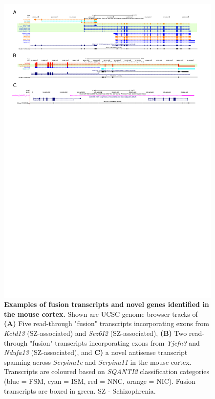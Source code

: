 \begin{landscape}
	\begin{figure}[htp]
		\begin{center}
			\includegraphics[page=1,trim={0 20cm 0 0},scale = 1.2]{Figures/FusionNovelGenes.pdf}
		\end{center}
		\vspace{1cm}
		\captionsetup{width=1.5\textwidth}
		\caption[Examples of fusion transcripts and novel genes identified in the mouse cortex]%
		{\textbf{Examples of fusion transcripts and novel genes identified in the mouse cortex.} Shown are UCSC genome browser tracks of \textbf{(A)} Five read-through "fusion" transcripts incorporating exons from \textit{Kctd13} (SZ-associated) and \textit{Sez6I2} (SZ-associated), \textbf{(B)} Two read-through "fusion" transcripts incorporating exons from \textit{Yjefn3} and \textit{Ndufa13} (SZ-associated), and \textbf{C)} a novel antisense transcript spanning across \textit{Serpina1e} and \textit{Serpina11} in the mouse cortex. Transcripts are coloured based on \textit{SQANTI2} classification categories (blue = FSM, cyan = ISM, red = NNC, orange = NIC). Fusion transcripts are boxed in green. SZ - Schizophrenia.}   
		\label{fig:isoseq_whole_novelfusion}
	\end{figure}
\end{landscape}


